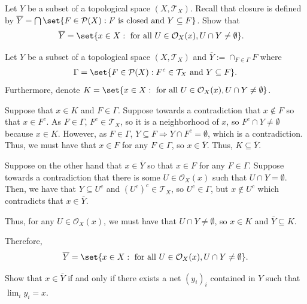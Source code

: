 \documentclass[10pt]{mypackage}
\begin{document}
\begin{problem}[Problem I.6]
  Let $Y$ be a subset of a topological space $\left( X,\mathcal{T}_X \right)$. Recall that closure is defined by $ \overline{Y} = \bigcap \set{F\in \mathcal{P}(X) : F\text{ is closed and }Y\subseteq F} $. Show that
  \begin{align*}
    \overline{Y} &= \set{x\in X : \text{ for all }U\in \mathcal{O}_X(x), U\cap Y \neq \emptyset}.
  \end{align*}
\end{problem}
\begin{solution}
  Let $Y$ be a subset of a topological space $(X,\mathcal T_X)$ and $\overline{Y} := \cap_{F\in\Gamma}F$ where 
  \begin{align*}
    \Gamma = \set{F\in \mathcal P(X): F^c\in \mathcal T_X \text{ and } Y\subseteq F}.
  \end{align*}
  Furthermore, denote $K = \set{x\in X: \text{ for all } U\in \mathcal{O}_X(x), U\cap Y \neq \emptyset}$.

  Suppose that $x \in K$ and $F \in \Gamma$. Suppose towards a contradiction that $x \notin F$ so that $x\in F^c$. As $F\in \Gamma$, $F^c \in \mathcal T_X$, so it is a neighborhood of $x$, so $F^c \cap Y \neq \emptyset$ because $x \in K$. However, as $F\in \Gamma$, $Y\subseteq F \Rightarrow Y\cap F^c = \emptyset$, which is a contradiction. Thus, we must have that $x \in F$ for any $F\in \Gamma$, so $x \in \overline{Y} $. Thus, $ K\subseteq \overline{Y}$.

Suppose on the other hand that $x\in \overline{Y}$ so that $x \in F$ for any $F \in \Gamma$. Suppose towards a contradiction that there is some $U \in \mathcal{O}_X(x)$ such that $U\cap Y = \emptyset$. Then, we have that $Y\subseteq U^c$ and $\left(U^c\right)^c\in \mathcal T_X$, so $U^c\in \Gamma$, but $x\notin U^c$ which contradicts that $x\in \overline{Y}$. 

Thus, for any $U\in \mathcal{O}_X(x)$, we must have that $U\cap Y \neq \emptyset$, so $x\in K$ and $\overline{Y}\subseteq K$.

Therefore,
\begin{align*}
 \overline{Y} = \set{x\in X: \text{ for all } U\in \mathcal{O}_X(x), U\cap Y \neq \emptyset}. 
\end{align*}
\end{solution}
\begin{problem}[Problem I.7]
  Show that $x\in \overline{Y}$ if and only if there exists a net $\left( y_i \right)_i$ contained in $Y$ such that $\lim_{i} y_i = x$.
\end{problem}
\end{document}

